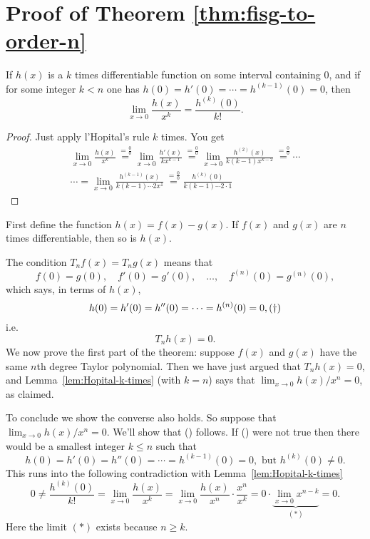 \section{Proof of Theorem \ref{thm:fisg-to-order-n}} %
\label{sec:proof-theorem-}

\begin{lemma}\label{lem:Hopital-k-times}
  If $h(x)$ is a $k$ times differentiable function on some interval
  containing $0$, and if for some integer $k<n$ one has
  $h(0)=h'(0)=\cdots=h^{(k-1)}(0)=0$, then
  \begin{equation}
    \label{eq:Hopital-k-times}
    \lim_{x\to0} \frac{h(x)}{x^k} = \frac{h^{(k)} (0)}{k!}.
  \end{equation}
\end{lemma}
\begin{proof}
  Just apply l'Hopital's rule $k$ times. You get
  \begin{multline*}
    \lim_{x\to0} \frac{h(x)}{x^k} \stackrel{=\frac00}{=} \lim_{x\to0}
    \frac{h'(x)}{kx^{k-1}} \stackrel{=\frac00}{=} \lim_{x\to0}
    \frac{h^{(2)}(x)}{k (k-1) x^{k-2}} \stackrel{=\frac00}{=}
    \cdots\\[1ex]
    \cdots = \lim_{x\to0} \frac{h^{(k-1)}(x)}{k (k-1)\cdots 2 x^1}
    \stackrel{=\frac00}{=} \frac{h^{(k)}(0)}{k (k-1)\cdots 2 \cdot1}
  \end{multline*}
\end{proof}

First define the function $h(x)=f(x)-g(x)$. If $f (x)$ and $g (x)$ are $n$
times differentiable, then so is $h(x)$.

The condition $T_nf(x) = T_ng(x)$ means that
\[
f(0)=g(0),\quad f'(0)=g'(0),\quad \ldots,\quad f^{(n)} (0) = g^{(n)} (0),
\]
which says, in terms of $h(x)$,
\[
h(0) = h'(0) = h''(0)= \cdots = h^{(n)}(0) = 0,\relax{(\dag)}
\]
i.e.
\[
T_nh(x)=0.
\]
We now prove the first part of the theorem: suppose $f (x)$ and $g (x)$ have
the same $n$th degree Taylor polynomial. Then we have just argued that
$T_nh(x)=0$, and Lemma~\ref{lem:Hopital-k-times} (with $k=n$) says that
$\lim_{x\to0}h(x)/x^n=0$, as claimed.

To conclude we show the converse also holds. So suppose that
$\lim_{x\to0}h(x)/x^n=0$. We'll show that (\dag) follows. If (\dag) were
not true then there would be a smallest integer $k\leq n$ such that
\[
h(0) = h'(0) = h''(0)= \cdots = h^{(k-1)}(0) = 0, \text{ but }h^{(k)}
(0)\neq0.
\]
This runs into the following contradiction with
Lemma~\ref{lem:Hopital-k-times}
\[
0\neq \frac{h^{(k)} (0)}{k!}  = \lim_{x\to0}\frac{h(x)}{x^k} =
\lim_{x\to0}\frac{h(x)}{x^n}\cdot\frac{x^n}{x^k} =
0\cdot\underbrace{\lim_{x\to0} x^{n-k}}_{(*)} =0.
\]
Here the limit $(*)$ exists because $n\geq k$.


